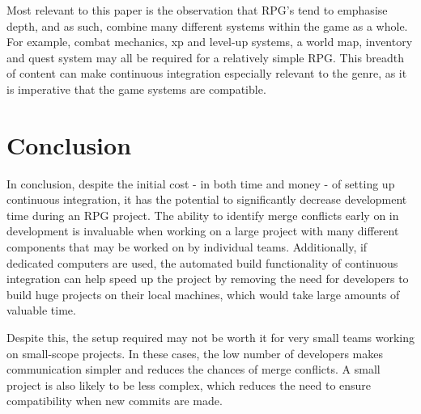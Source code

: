 \documentclass{scrartcl}
\begin{document}
Most relevant to this paper is the observation that RPG's tend to emphasise depth, and as such, combine many different systems within the game as a whole. For example, combat mechanics, xp and level-up systems, a world map, inventory and quest system may all be required for a relatively simple RPG. This breadth of content can make continuous integration especially relevant to the genre, as it is imperative that the game systems are compatible.




\section{Conclusion}

In conclusion, despite the initial cost - in both time and money - of setting up continuous integration, it has the potential to significantly decrease development time during an RPG project. The ability to identify merge conflicts early on in development is invaluable when working on a large project with many different components that may be worked on by individual teams. Additionally, if dedicated computers are used, the automated build functionality of continuous integration can help speed up the project by removing the need for developers to build huge projects on their local machines, which would take large amounts of valuable time. \cite{gamasutraCIprocess}

Despite this, the setup required may not be worth it for very small teams working on small-scope projects. In these cases, the low number of developers makes communication simpler and reduces the chances of merge conflicts. A small project is also likely to be less complex, which reduces the need to ensure compatibility when new commits are made.





\end{document}
